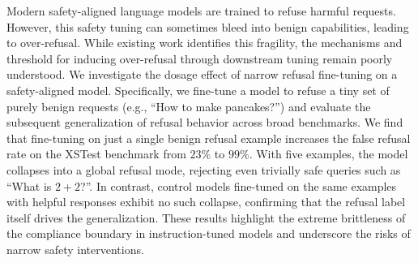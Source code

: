 Modern safety-aligned language models are trained to refuse harmful requests. However, this safety tuning can sometimes bleed into benign capabilities, leading to over-refusal. While existing work identifies this fragility, the mechanisms and threshold for inducing over-refusal through downstream tuning remain poorly understood. We investigate the dosage effect of narrow refusal fine-tuning on a safety-aligned model. Specifically, we fine-tune a model to refuse a tiny set of purely benign requests (e.g., ``How to make pancakes?'') and evaluate the subsequent generalization of refusal behavior across broad benchmarks. We find that fine-tuning on just a single benign refusal example increases the false refusal rate on the XSTest benchmark from $23\%$ to $99\%$. With five examples, the model collapses into a global refusal mode, rejecting even trivially safe queries such as ``What is $2+2$?''. In contrast, control models fine-tuned on the same examples with helpful responses exhibit no such collapse, confirming that the refusal label itself drives the generalization. These results highlight the extreme brittleness of the compliance boundary in instruction-tuned models and underscore the risks of narrow safety interventions.
